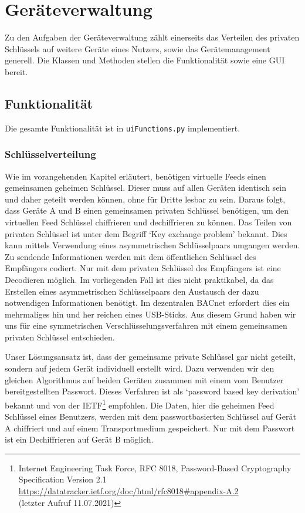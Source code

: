 \documentclass[a4paper,titlepage]{article}
\newcommand{\ilc}[1]{\textcolor{codeColor}{\texttt{#1}}}
\begin{document}
\section{Geräteverwaltung}
Zu den Aufgaben der Geräteverwaltung zählt einerseits das Verteilen des privaten Schlüssels auf weitere Geräte eines Nutzers, sowie das Gerätemanagement generell.  Die Klassen und Methoden stellen die Funktionalität sowie eine GUI bereit.

\subsection{Funktionalität}
Die gesamte Funktionalität ist in \ilc{uiFunctions.py} implementiert. 

\subsubsection*{Schlüsselverteilung}
Wie im vorangehenden Kapitel erläutert, benötigen virtuelle Feeds einen gemeinsamen geheimen Schlüssel. Dieser muss auf allen Geräten identisch sein und daher geteilt werden können, ohne für Dritte lesbar zu sein. Daraus folgt, dass Geräte A und B einen gemeinsamen privaten Schlüssel benötigen, um den virtuellen Feed Schlüssel chiffrieren und dechiffrieren zu können.  Das Teilen von privaten Schlüssel ist unter dem Begriff `Key exchange problem' bekannt. Dies kann mittels Verwendung eines asymmetrischen Schlüsselpaars umgangen werden. Zu sendende Informationen werden mit dem öffentlichen Schlüssel des Empfängers codiert. Nur mit dem privaten Schlüssel des Empfängers ist eine Decodieren möglich. Im vorliegenden Fall ist dies nicht praktikabel, da das Erstellen eines asymmetrischen Schlüsselpaars den Austausch der dazu notwendigen Informationen benötigt. Im dezentralen BACnet erfordert dies ein mehrmaliges hin und her reichen eines USB-Sticks. Aus diesem Grund haben wir uns für eine symmetrischen Verschlüsselungsverfahren mit einem gemeinsamen privaten Schlüssel entschieden. 

Unser Lösungsansatz ist, dass der gemeinsame private Schlüssel gar nicht geteilt, sondern auf jedem Gerät individuell erstellt wird. Dazu verwenden wir den gleichen Algorithmus auf beiden Geräten zusammen mit einem vom Benutzer bereitgestellten Passwort. Dieses Verfahren ist als `password based key derivation' bekannt und von der IETF\footnote{Internet Engineering Task Force, RFC 8018, Password-Based Cryptography Specification Version 2.1\\ \url{https://datatracker.ietf.org/doc/html/rfc8018\#appendix-A.2} \\ (letzter Aufruf 11.07.2021)} empfohlen. Die Daten, hier die geheimen Feed Schlüssel eines Benutzers, werden mit dem passwortbasierten Schlüssel auf Gerät A chiffriert und auf einem Transportmedium gespeichert. Nur mit dem Passwort ist ein Dechiffrieren auf Gerät B möglich.
\end{document}
